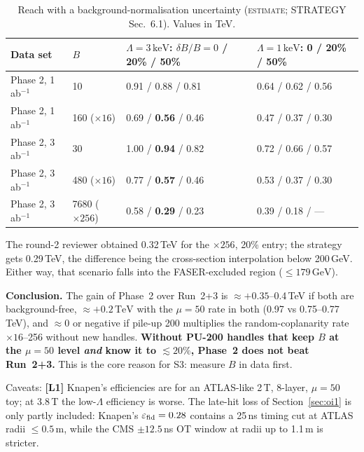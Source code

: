 \documentclass[11pt,a4paper]{article}
\newcommand{\EST}{\textsc{estimate}}
\newcommand{\GeV}{\,\mathrm{GeV}}
\newcommand{\TeV}{\,\mathrm{TeV}}
\newcommand{\keV}{\,\mathrm{keV}}
\newcommand{\lab}[1]{\textbf{[#1]}}
\begin{document}
{\small
\begin{longtable}{@{}L{4.85cm}L{2.65cm}C{4.30cm}C{4.30cm}@{}}
\caption{Reach with a background-normalisation uncertainty (\EST; STRATEGY Sec.~6.1). Values in TeV.}\label{tab:reachsyst}\\
\toprule Data set & $B$ & $\Lambda=3\keV$: $\delta B/B=0$ / 20\% / 50\% & $\Lambda=1\keV$: 0 / 20\% / 50\%\\\midrule\endfirsthead
\bottomrule\endfoot
Phase 2, 1\,ab$^{-1}$ & 10 & 0.91 / 0.88 / 0.81 & 0.64 / 0.62 / 0.56\\
Phase 2, 1\,ab$^{-1}$ & 160 ($\times16$) & 0.69 / \textbf{0.56} / 0.46 & 0.47 / 0.37 / 0.30\\
Phase 2, 3\,ab$^{-1}$ & 30 & 1.00 / \textbf{0.94} / 0.82 & 0.72 / 0.66 / 0.57\\
Phase 2, 3\,ab$^{-1}$ & 480 ($\times16$) & 0.77 / \textbf{0.57} / 0.46 & 0.53 / 0.37 / 0.30\\
Phase 2, 3\,ab$^{-1}$ & 7680 ($\times256$) & 0.58 / \textbf{0.29} / 0.23 & 0.39 / 0.18 / ---\\
\end{longtable}
}
The round-2 reviewer obtained 0.32\,TeV for the $\times256$, 20\% entry; the strategy gets 0.29\,TeV, the difference being the cross-section interpolation below 200\,GeV. Either way, that scenario falls into the FASER-excluded region ($\leq179\GeV$).

\begin{key}
\textbf{Conclusion.} The gain of Phase~2 over Run~2+3 is $\approx+0.35$--0.4\,TeV if both are background-free, $\approx+0.2\TeV$ with the $\mu=50$ rate in both (0.97 vs 0.75--0.77\,TeV), and $\approx0$ or negative if pile-up 200 multiplies the random-coplanarity rate $\times16$--256 without new handles. \textbf{Without PU-200 handles that keep $B$ at the $\mu=50$ level \emph{and} know it to $\lesssim20\%$, Phase~2 does not beat Run~2+3.} This is the core reason for S3: measure $B$ in data first.
\end{key}
Caveats: \lab{L1} Knapen's efficiencies are for an ATLAS-like 2\,T, 8-layer, $\mu=50$ toy; at 3.8\,T the low-$\Lambda$ efficiency is worse. The late-hit loss of Section~\ref{sec:oi1} is only partly included: Knapen's $\varepsilon_{\rm fid}=0.28$ contains a 25\,ns timing cut at ATLAS radii $\leq0.5$\,m, while the CMS $\pm12.5$\,ns OT window at radii up to 1.1\,m is stricter.
\end{document}

